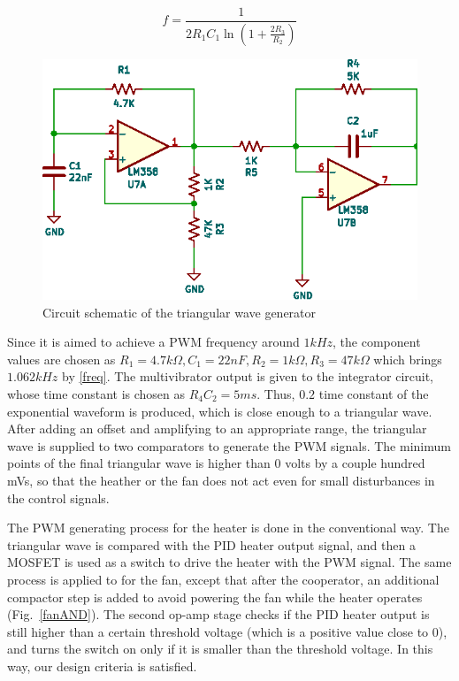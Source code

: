 \documentclass[conference]{IEEEtran}
\begin{document}
\begin{equation}
f=\frac{1}{2R_{1}C_{1}\ln{(1+\frac{2R_{3}}{R_{2}})}}\label{freq}
\end{equation}

\begin{figure}[h]
\centerline{\includegraphics[scale=1]{figures/osci.eps}}
\caption{Circuit schematic of the triangular wave generator}
\label{triGen}
\end{figure}

Since it is aimed to achieve a PWM frequency around $1kHz$, the component values are chosen as $R_{1}=4.7k\Omega, C_{1}=22nF, R_{2}=1k\Omega, R_{3}=47k\Omega$ which brings $1.062kHz$ by \eqref{freq}. The multivibrator output is given to the integrator circuit, whose time constant is chosen as $R_{4}C_{2}=5ms$. Thus, $0.2$ time constant of the exponential waveform is produced, which is close enough to a triangular wave. After adding an offset and amplifying to an appropriate range, the triangular wave is supplied to two comparators to generate the PWM signals. The minimum points of the final triangular wave is higher than 0 volts by a couple hundred mVs, so that the heather or the fan does not act even for small disturbances in the control signals.

The PWM generating process for the heater is done in the conventional way. The triangular wave is compared with the PID heater output signal, and then a MOSFET is used as a switch to drive the heater with the PWM signal. The same process is applied to for the fan, except that after the cooperator, an additional compactor step is added to avoid powering the fan while the heater operates (Fig.~\ref{fanAND}). The second op-amp stage checks if the PID heater output is still higher than a certain threshold voltage (which is a positive value close to 0), and turns the switch on only if it is smaller than the threshold voltage. In this way, our design criteria is satisfied.
\end{document}
